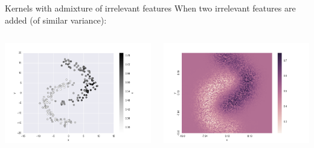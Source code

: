 \documentclass[11pt]{beamer}
\begin{document}
\begin{frame}{Kernels with admixture of irrelevant features}
When two irrelevant features are added (of similar variance):
\begin{columns}
\includegraphics[scale=0.3]{kernel_dim_scale_2.png} 

\includegraphics[scale=0.3]{kernel_dim_scale_2_hp.png} 

\end{columns}
\end{frame}
\end{document}
